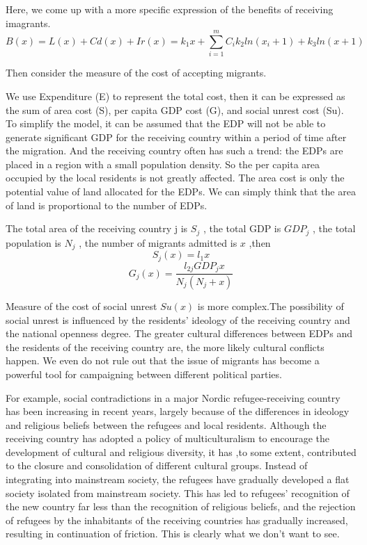 \documentclass{mcmthesis}
\begin{document}
Here, we come up with a more specific expression of the benefits of receiving imagrants.
\begin{equation}
B(x)=L(x)+Cd(x)+Ir(x)=k_{1}x+\sum_{i=1}^{m}{C_{i}k_{2}ln(x_{i}+1)+k_{3}ln(x+1)}
\end{equation}

Then consider the measure of the cost of accepting migrants.

We use Expenditure (E) to represent the total cost, then it can be expressed as the sum of area cost (S), per capita GDP cost (G), and social unrest cost (Su). To simplify the model, it can be assumed that the EDP will not be able to generate significant GDP for the receiving country within a period of time after the migration. And the receiving country often has such a trend: the EDPs are placed in a region with a small population density. So the per capita area occupied by the local residents is not greatly affected. The area cost is only the potential value of land allocated for the EDPs. We can simply think that the area of land is proportional to the number of EDPs.

The total area of the receiving country j is $ S_{j} $ , the total GDP is $ {GDP}_{j}$ , the total population is $ N_{j} $ , the number of migrants admitted is $ x $ ,then
\begin{equation}
S_{j}(x)=l_{1}x
\end{equation}
\begin{equation}
G_{j}(x)=\dfrac{l_{2j}GDP_{j}x}{N_{j}(N_{j}+x)}
\end{equation}

Measure of the cost of social unrest $ Su(x) $ is more complex.The possibility of social unrest is influenced by the residents' ideology of the receiving country and the national openness degree. The greater cultural differences between EDPs and the residents of the receiving country are, the more likely cultural conflicts happen. We even do not rule out that the issue of migrants has become a powerful tool for campaigning between different political parties. 

For example, social contradictions in a major Nordic refugee-receiving country has been increasing in recent years, largely because of the differences in ideology and religious beliefs between the refugees and local residents. Although the receiving country has adopted a policy of multiculturalism to encourage the development of cultural and religious diversity, it has ,to some extent, contributed to the closure and consolidation of different cultural groups. Instead of integrating into mainstream society, the refugees have gradually developed a flat society isolated from mainstream society. This has led to refugees' recognition of the new country far less than the recognition of religious beliefs, and the rejection of refugees by the inhabitants of the receiving countries has gradually increased, resulting in continuation of friction. This is clearly what we don't want to see. 
\end{document}
